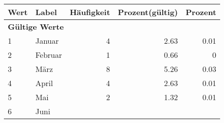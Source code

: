      \begin{longtable}{lXrrr}
     \toprule
     \textbf{Wert} & \textbf{Label} & \textbf{Häufigkeit} & \textbf{Prozent(gültig)} & \textbf{Prozent} \\
     \endhead
     \midrule
     \multicolumn{5}{l}{\textbf{Gültige Werte}}\\

     1 &
     \multicolumn{1}{X}{ Januar   } &


       \num{4} &
       \num[round-mode=places,round-precision=2]{2.63} &
         \num[round-mode=places,round-precision=2]{0.01} \\

     2 &
     \multicolumn{1}{X}{ Februar   } &


       \num{1} &
       \num[round-mode=places,round-precision=2]{0.66} &
         \num[round-mode=places,round-precision=2]{0} \\

     3 &
     \multicolumn{1}{X}{ März   } &


       \num{8} &
       \num[round-mode=places,round-precision=2]{5.26} &
         \num[round-mode=places,round-precision=2]{0.03} \\

     4 &
     \multicolumn{1}{X}{ April   } &


       \num{4} &
       \num[round-mode=places,round-precision=2]{2.63} &
         \num[round-mode=places,round-precision=2]{0.01} \\

     5 &
     \multicolumn{1}{X}{ Mai   } &


       \num{2} &
       \num[round-mode=places,round-precision=2]{1.32} &
         \num[round-mode=places,round-precision=2]{0.01} \\

     6 &
     \multicolumn{1}{X}{ Juni   } &



\end{longtable}
